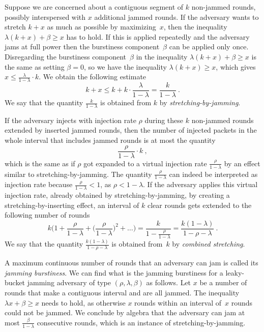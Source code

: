 \documentclass[11pt]{article}
\begin{document}
Suppose we are concerned about a contiguous segment of $k$ non-jammed rounds, possibly interspersed with $x$ additional jammed rounds.
If the adversary wants to stretch $k+x$ as much as possible by maximizing~$x$, then the inequality $\lambda (k+x) + \beta\ge x$ has to hold.
If this is applied repeatedly and the adversary jams at full power then the burstiness component~$\beta$ can be applied only once.
Disregarding the burstiness component~$\beta$ in the inequality $\lambda (k+x) + \beta\ge x$ is the same as setting $\beta=0$, so we have the inequality $\lambda (k+x)\ge x$, which gives $x\le \frac{\lambda }{1-\lambda}\cdot k$.
We obtain the following estimate 
\[
k+x\le k + k\cdot \frac{\lambda }{1-\lambda} = \frac{ k}{1-\lambda}
\ .
\]
We say that the quantity $\frac{ k}{1-\lambda}$ is obtained from $k$ by \emph{stretching-by-jamming}.

If the adversary injects with injection rate $\rho$ during these $k$ non-jammed rounds extended by inserted jammed rounds, then the number of injected packets in the whole interval that includes jammed rounds is at most the quantity 
\[
 \frac{ \rho}{1-\lambda} \cdot k
\ ,
\]
which is the same as if $\rho$ got expanded to a virtual injection rate $\frac{\rho}{1-\lambda}$ by an effect similar to stretching-by-jamming.
The quantity $\frac{\rho}{1-\lambda}$ can indeed be interpreted as injection rate because $\frac{\rho}{1-\lambda}<1$, as $\rho<1-\lambda$.
If the adversary applies this virtual injection rate, already obtained by stretching-by-jamming, by creating a stretching-by-inserting effect, an interval of $k$ clear rounds gets extended to the following number of rounds
\[
k\bigl(1 + \frac{\rho}{1-\lambda} +\bigl( \frac{\rho}{1-\lambda}\bigr)^2+\ldots\bigr) 
=  \frac{k}{1-\frac{\rho}{1-\lambda}} 
= \frac{k(1-\lambda)}{1-\rho-\lambda}
\ .
\]
We say that the quantity $\frac{k(1-\lambda)}{1-\rho-\lambda}$ is obtained from~$k$ by \emph{combined stretching}.

A maximum continuous number of rounds that an adversary can jam is called its \emph{jamming burstiness}.
We can find what is the jamming burstiness for a  leaky-bucket jamming adversary of type $(\rho,\lambda,\beta)$ as follows.
Let $x$ be a number of rounds that make a contiguous interval and are all jammed.
The inequality $\lambda x+\beta \ge x$ needs to hold, as otherwise $x$ rounds within an interval of~$x$ rounds could not be jammed. 
We conclude by algebra that the adversary can jam at most $\frac{\beta}{1-\lambda}$ consecutive rounds, which is an instance of stretching-by-jamming.
\end{document}
